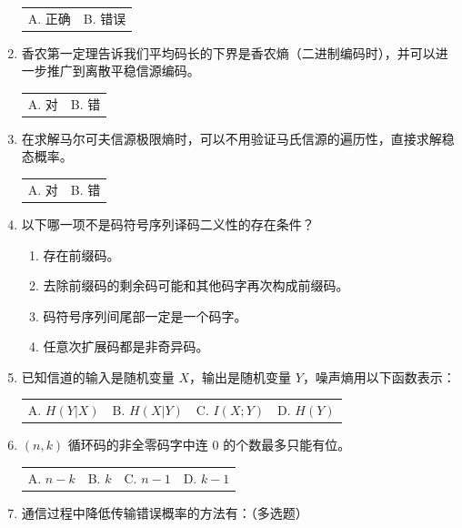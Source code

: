 \documentclass[UTF8,a4paper,12pt]{ctexart}
\newcommand{\blank}[1][3cm]{\underline{\hspace{#1}}}
\begin{document}
\begin{enumerate}[label=\arabic*., leftmargin=2em, itemsep=1.4em]
\begin{tabular}{@{}p{}p{}@{}}
A. 正确 & B. 错误
\end{tabular}


\item 香农第一定理告诉我们平均码长的下界是香农熵（二进制编码时），并可以进一步推广到离散平稳信源编码。

\begin{tabular}{@{}p{}p{}@{}}
A. 对 & B. 错
\end{tabular}

\item 在求解马尔可夫信源极限熵时，可以不用验证马氏信源的遍历性，直接求解稳态概率。

\begin{tabular}{@{}p{}p{}@{}}
A. 对 & B. 错
\end{tabular}


\item 以下哪一项不是码符号序列译码二义性的存在条件？

\begin{enumerate}[label=\Alph*. , leftmargin=2em, itemsep=0.4em]
\item 存在前缀码。
\item 去除前缀码的剩余码可能和其他码字再次构成前缀码。
\item 码符号序列间尾部一定是一个码字。
\item 任意次扩展码都是非奇异码。
\end{enumerate}


\item 已知信道的输入是随机变量 $X$，输出是随机变量 $Y$，噪声熵用以下函数表示：

\begin{tabular}{@{}p{}p{}p{}p{}@{}}
A. $H(Y|X)$ & B. $H(X|Y)$ & C. $I(X;Y)$ & D. $H(Y)$
\end{tabular}


\item $(n,k)$ 循环码的非全零码字中连 $0$ 的个数最多只能有\blank[1.5cm]位。

\begin{tabular}{@{}p{}p{}p{}p{}@{}}
A. $n-k$ & B. $k$ & C. $n-1$ & D. $k-1$
\end{tabular}


\item 通信过程中降低传输错误概率的方法有：（多选题）


\end{enumerate}
\end{document}
